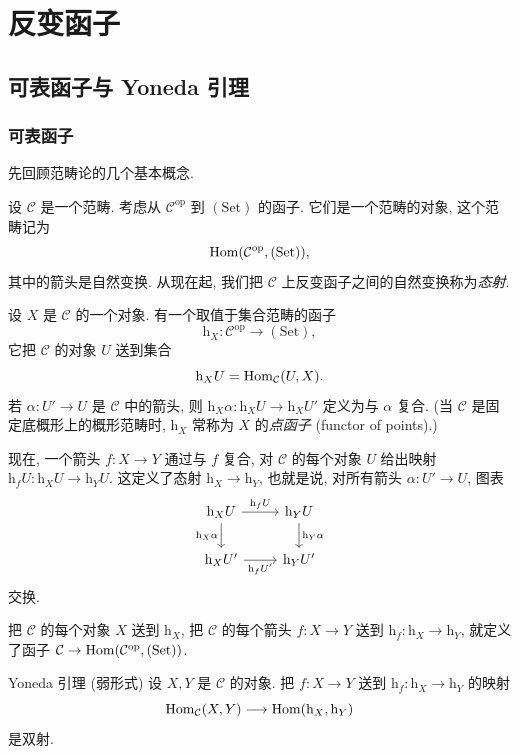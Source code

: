\chapter{反变函子}\label{ch02}
\section{可表函子与 Yoneda 引理}\label{ch02:sec21}
\subsection{可表函子}
先回顾范畴论的几个基本概念.

设 $\mathcal C$ 是一个范畴. 考虑从 $\mathcal C^{\mathrm{op}}$ 到 $(\mathrm{Set})$ 的函子. 它们是一个范畴的对象, 这个范畴记为
\[
\operatorname{Hom}(\mathcal C^{\mathrm{op}},(\mathrm{Set})),
\]
其中的箭头是自然变换. 从现在起, 我们把 $\mathcal C$ 上反变函子之间的自然变换称为\emph{态射}.

设 $X$ 是 $\mathcal C$ 的一个对象. 有一个取值于集合范畴的函子
\[
\mathrm h_X:\mathcal C^{\mathrm{op}}\longrightarrow(\mathrm{Set}),
\]
它把 $\mathcal C$ 的对象 $U$ 送到集合
\[
\mathrm h_XU=\operatorname{Hom}_{\mathcal C}(U,X).
\]
若 $\alpha:U'\to U$ 是 $\mathcal C$ 中的箭头, 则 $\mathrm h_X\alpha:\mathrm h_XU\to\mathrm h_XU'$ 定义为与 $\alpha$ 复合. (当 $\mathcal C$ 是固定底概形上的概形范畴时, $\mathrm h_X$ 常称为 $X$ 的\emph{点函子} (functor of points).)

现在, 一个箭头 $f:X\to Y$ 通过与 $f$ 复合, 对 $\mathcal C$ 的每个对象 $U$ 给出映射 $\mathrm h_fU:\mathrm h_XU\to\mathrm h_YU$. 这定义了态射 $\mathrm h_X\to\mathrm h_Y$, 也就是说, 对所有箭头 $\alpha:U'\to U$, 图表
\[
\begin{tikzcd}
\mathrm h_XU\arrow[r,"\mathrm h_fU"]\arrow[d,"\mathrm h_X\alpha"']&\mathrm h_YU\arrow[d,"\mathrm h_Y\alpha"]\\
\mathrm h_XU'\arrow[r,"\mathrm h_fU'"']&\mathrm h_YU'
\end{tikzcd}
\]
交换.

把 $\mathcal C$ 的每个对象 $X$ 送到 $\mathrm h_X$, 把 $\mathcal C$ 的每个箭头 $f:X\to Y$ 送到 $\mathrm h_f:\mathrm h_X\to\mathrm h_Y$, 就定义了函子 $\mathcal C\to\operatorname{Hom}(\mathcal C^{\mathrm{op}},(\mathrm{Set}))$.

\begin{origstatement}{Yoneda 引理 (弱形式)}{}\label{ch02:yonedaweak}
设 $X,Y$ 是 $\mathcal C$ 的对象. 把 $f:X\to Y$ 送到 $\mathrm h_f:\mathrm h_X\to\mathrm h_Y$ 的映射
\[
\operatorname{Hom}_{\mathcal C}(X,Y)\longrightarrow\operatorname{Hom}(\mathrm h_X,\mathrm h_Y)
\]
是双射.
\end{origstatement}


